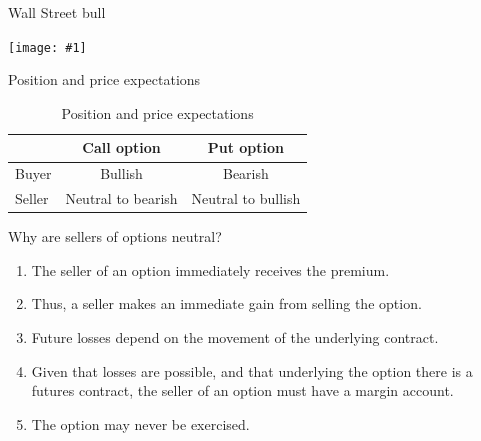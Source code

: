 \documentclass[table,xcolor=pdftex,dvipsnames]{beamer}\usepackage[]{graphicx}\usepackage[]{color}
\newcommand {\framedgraphic}[1] {
        \begin{center}
            \texttt{[image: \#1]}
        \end{center}
        \vspace{-1\baselineskip}
}
\begin{document}

\begin{frame}{Wall Street bull}
        \framedgraphic{Bull_Wall_Street.png}
\end{frame}


\begin{frame}{Position and price expectations}
\begin{table}
\caption{Position and price expectations}
\scriptsize
\begin{tabular}{l c c }
  \toprule
    & Call option & Put option \\
  \midrule
  Buyer & Bullish & Bearish\\
  \addlinespace[0.075in]
  Seller & Neutral to bearish & Neutral to bullish \\
  \bottomrule
\end{tabular}
\end{table}
\end{frame}


\begin{frame}{Why are sellers of options neutral?}
\begin{enumerate}[label=\textbullet]
    \item The seller of an option immediately receives the premium.
    \item Thus, a seller makes an immediate gain from selling the option.
    \item Future losses depend on the movement of the underlying contract.
    \item Given that losses are possible, and that underlying the option there is a futures contract, the seller of an option must have a margin account.
    \item The option may never be exercised.
\end{enumerate}
\end{frame}


\end{document}
